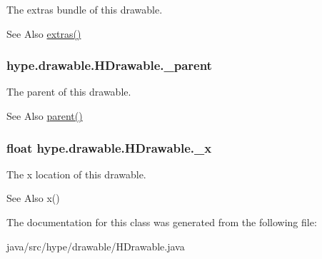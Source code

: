 The extras bundle of this drawable. 

\begin{DoxySeeAlso}{See Also}
\hyperlink{classhype_1_1drawable_1_1_h_drawable_a7505189d57beed823910e448eada428e}{extras()} 
\end{DoxySeeAlso}
\hypertarget{classhype_1_1drawable_1_1_h_drawable_a1f95d00444c6964efa4239ddf135a10e}{
\subsubsection[{\-\_\-parent}]{ hype.\-drawable.\-H\-Drawable.\-\_\-parent\hspace{0.3cm}{\ttfamily [protected]}}}\label{classhype_1_1drawable_1_1_h_drawable_a1f95d00444c6964efa4239ddf135a10e}


The parent of this drawable. 

\begin{DoxySeeAlso}{See Also}
\hyperlink{classhype_1_1drawable_1_1_h_drawable_a8727cdaaf42b1a6fe73179a1c8422f74}{parent()} 
\end{DoxySeeAlso}
\hypertarget{classhype_1_1drawable_1_1_h_drawable_a20c0ae16de46b74c903667ac2db1640a}{
\subsubsection[{\-\_\-x}]{\setlength{\rightskip}{0pt plus 5cm}float hype.\-drawable.\-H\-Drawable.\-\_\-x\hspace{0.3cm}{\ttfamily [protected]}}}\label{classhype_1_1drawable_1_1_h_drawable_a20c0ae16de46b74c903667ac2db1640a}


The x location of this drawable. 

\begin{DoxySeeAlso}{See Also}
x() 
\end{DoxySeeAlso}


The documentation for this class was generated from the following file\-:\begin{DoxyCompactItemize}
\item 
java/src/hype/drawable/H\-Drawable.\-java\end{DoxyCompactItemize}
